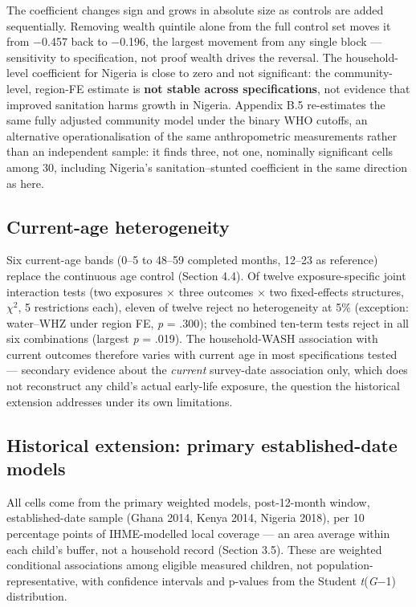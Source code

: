 The coefficient changes sign and grows in absolute size as controls are added sequentially. Removing wealth quintile alone from the full control set moves it from −0.457 back to −0.196, the largest movement from any single block --- sensitivity to specification, not proof wealth drives the reversal. The household-level coefficient for Nigeria is close to zero and not significant: the community-level, region-FE estimate is \textbf{not stable across specifications}, not evidence that improved sanitation harms growth in Nigeria. Appendix B.5 re-estimates the same fully adjusted community model under the binary WHO cutoffs, an alternative operationalisation of the same anthropometric measurements rather than an independent sample: it finds three, not one, nominally significant cells among 30, including Nigeria's sanitation--stunted coefficient in the same direction as here.

\subsection{Current-age heterogeneity}\label{sec:5.5}

Six current-age bands (0--5 to 48--59 completed months, 12--23 as reference) replace the continuous age control (Section 4.4). Of twelve exposure-specific joint interaction tests (two exposures × three outcomes × two fixed-effects structures, \(\chi^2\), 5 restrictions each), eleven of twelve reject no heterogeneity at 5\% (exception: water--WHZ under region FE, \emph{p} = .300); the combined ten-term tests reject in all six combinations (largest \emph{p} = .019). The household-WASH association with current outcomes therefore varies with current age in most specifications tested --- secondary evidence about the \emph{current} survey-date association only, which does not reconstruct any child's actual early-life exposure, the question the historical extension addresses under its own limitations.

\subsection{Historical extension: primary established-date models}\label{sec:5.6}

All cells come from the primary weighted models, post-12-month window, established-date sample (Ghana 2014, Kenya 2014, Nigeria 2018), per 10 percentage points of IHME-modelled local coverage --- an area average within each child's buffer, not a household record (Section 3.5). These are weighted conditional associations among eligible measured children, not population-representative, with confidence intervals and p-values from the Student \emph{t}(\emph{G}−1) distribution.

